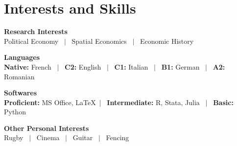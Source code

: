 \documentclass[a4paper,11pt]{article}
\begin{document}
\section{Interests and Skills}

\noindent
\newline
\textbf{Research Interests} \\
Political Economy \ $|$ \ Spatial Economics \ $|$ \ Economic History

\noindent
\textbf{Languages} \\
\textbf{Native:} French \ $|$ \ \textbf{C2:} English \ $|$ \ \textbf{C1:} Italian \ $|$ \ \textbf{B1:} German \ $|$ \ \textbf{A2:} Romanian

\noindent
\textbf{Softwares} \\
\textbf{Proficient:} MS Office, \LaTeX \ $|$ \ \textbf{Intermediate:} R, Stata, Julia \ $|$ \ \textbf{Basic:} Python 

\noindent
\textbf{Other Personal Interests} \\
Rugby \ $|$ \ Cinema \ $|$ \ Guitar \ $|$ \ Fencing

\vfill
{}
\end{document}
